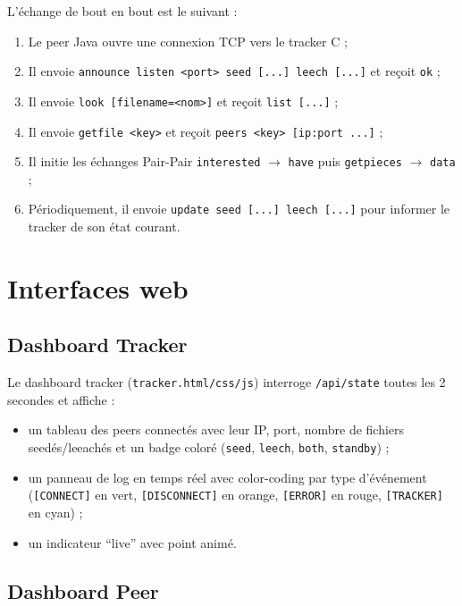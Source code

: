 \documentclass[12pt,a4paper]{article}
\begin{document}
L'échange de bout en bout est le suivant :

\begin{enumerate}[leftmargin=1.2cm]
  \item Le peer Java ouvre une connexion TCP vers le tracker C ;
  \item Il envoie \texttt{announce listen <port> seed [...] leech [...]} et
        reçoit \texttt{ok} ;
  \item Il envoie \texttt{look [filename=<nom>]} et reçoit
        \texttt{list [...]} ;
  \item Il envoie \texttt{getfile <key>} et reçoit
        \texttt{peers <key> [ip:port ...]} ;
  \item Il initie les échanges Pair-Pair \texttt{interested} $\rightarrow$
        \texttt{have} puis \texttt{getpieces} $\rightarrow$ \texttt{data} ;
  \item Périodiquement, il envoie \texttt{update seed [...] leech [...]} pour
        informer le tracker de son état courant.
\end{enumerate}


\section{Interfaces web}

\subsection{Dashboard Tracker}

Le dashboard tracker (\texttt{tracker.html/css/js}) interroge \texttt{/api/state}
toutes les 2 secondes et affiche :
\begin{itemize}[leftmargin=1.2cm]
  \item un tableau des peers connectés avec leur IP, port, nombre de fichiers
        seedés/leeachés et un badge coloré (\texttt{seed}, \texttt{leech},
        \texttt{both}, \texttt{standby}) ;
  \item un panneau de log en temps réel avec color-coding par type d'événement
        (\texttt{[CONNECT]} en vert, \texttt{[DISCONNECT]} en orange,
        \texttt{[ERROR]} en rouge, \texttt{[TRACKER]} en cyan) ;
  \item un indicateur ``live'' avec point animé.
\end{itemize}

\subsection{Dashboard Peer}
\end{document}
